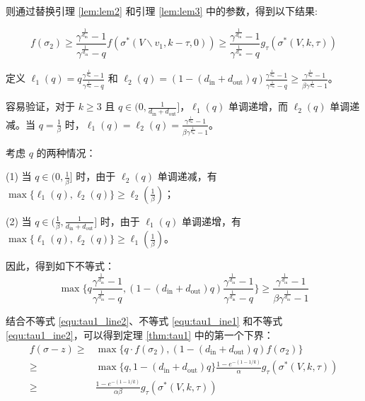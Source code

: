 则通过替换引理 \ref{lem:lem2} 和引理 \ref{lem:lem3} 中的参数，得到以下结果:

\begin{equation}
    f(\sigma_2) \ge \frac{\gamma^{\frac{1}{d_{\text{in}}}}-1}{\gamma^{\frac{1}{d_{\text{in}}}}-q} f(\sigma^*(V\backslash v_1,k-\tau,0)) \ge \frac{\gamma^{\frac{1}{d_{\text{in}}}}-1}{\gamma^{\frac{1}{d_{\text{in}}}}-q} g_{\tau} (\sigma^*(V,k,\tau)) \label{equ:tau1_ine3}
\end{equation}

定义 $\ell_1(q) = q \frac{\gamma^{\frac{1}{d_{\text{in}}}}-1}{\gamma^{\frac{1}{d_{\text{in}}}}-q}$ 和 $\ell_2(q) = (1-(d_{\text{in}} + d_{\text{out}})q) \frac{\gamma^{\frac{1}{d_{\text{in}}}}-1}{\gamma^{\frac{1}{d_{\text{in}}}}-q} \ge \frac{\gamma^{\frac{1}{d_{\text{in}}}}-1}{\beta \gamma^{\frac{1}{d_{\text{in}}}}-1}$。

容易验证，对于 $k\ge 3$ 且 $q\in (0,\frac{1}{d_{\text{in}}+d_{\text{out}}}]$，$\ell_1(q)$ 单调递增，而 $\ell_2(q)$ 单调递减。当 $q=\frac{1}{\beta}$ 时，$\ell_1(q)=\ell_2(q)=\frac{\gamma^{\frac{1}{d_{\text{in}}}}-1}{\beta \gamma^{\frac{1}{d_{\text{in}}}}-1}$。

考虑 $q$ 的两种情况：

(1) 当 $q \in (0,\frac{1}{\beta}]$ 时，由于 $\ell_2(q)$ 单调递减，有 $\max\{\ell_1(q),\ell_2(q)\}\ge \ell_2(\frac{1}{\beta})$；

(2) 当 $q \in (\frac{1}{\beta},\frac{1}{d_{\text{in}}+d_{\text{out}}}]$ 时，由于 $\ell_1(q)$ 单调递增，有 $\max\{\ell_1(q),\ell_2(q)\}\ge \ell_1(\frac{1}{\beta})$。

因此，得到如下不等式：
\begin{equation}
    \max\{ q \frac{\gamma^{\frac{1}{d_{\text{in}}}}-1}{\gamma^{\frac{1}{d_{\text{in}}}}-q} , (1-(d_{\text{in}} + d_{\text{out}})q) \frac{\gamma^{\frac{1}{d_{\text{in}}}}-1}{\gamma^{\frac{1}{d_{\text{in}}}}-q} \} \ge \frac{\gamma^{\frac{1}{d_{\text{in}}}}-1}{\beta \gamma^{\frac{1}{d_{\text{in}}}}-1} \label{equ:tau1_ine4}    
\end{equation}

结合不等式 \ref{equ:tau1_line2}、不等式 \ref{equ:tau1_ine1} 和不等式 \ref{equ:tau1_ine2}，可以得到定理 \ref{thm:tau1} 中的第一个下界：
\begin{align}
    f(\sigma -z ) \ge & \max\{ q \cdot f(\sigma_2),(1-(d_{\text{in}} + d_{\text{out}})q) f(\sigma_2)\} \\
    \ge & \max\{q,1-(d_{\text{in}} + d_{\text{out}})q\} \frac{1-e^{-(1-1/k)}}{\alpha} g_\tau(\sigma^*(V,k,\tau)) \\
    \ge & \frac{1-e^{-(1-1/k)}}{\alpha\beta} g_\tau(\sigma^*(V,k,\tau))
\end{align}


